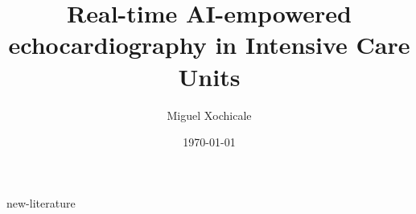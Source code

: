 \documentclass[12pt]{article}
\title{
Real-time AI-empowered echocardiography in Intensive Care Units %
}
\author{
Miguel Xochicale
}
\date{
\today
}
\begin{document}
\maketitle
\thispagestyle{empty} %

\tableofcontents
{new-literature}


\end{document}

